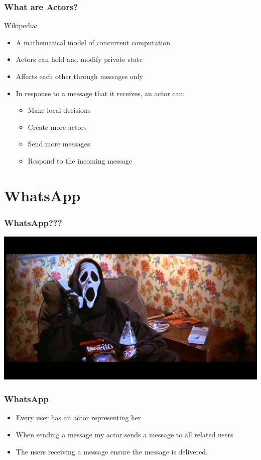 \documentclass{beamer}
\begin{document}
\begin{frame}
\frametitle{What are Actors?}
Wikipedia:
\begin{itemize}
\item A mathematical model of concurrent computation
\item Actors can hold and modify private state
\item Affects each other through messages only
\item In response to a message that it receives, an actor can:
\begin{itemize}
\item Make local decisions
\item Create more actors
\item Send more messages
\item Respond to the incoming message
\end{itemize}
\end{itemize}
\end{frame}


\section{WhatsApp}


\begin{frame}
\frametitle{WhatsApp???}
\includegraphics[width=0.8\linewidth]{./whatsup.jpg}
\end{frame}


\begin{frame}
\frametitle{WhatsApp}
\begin{itemize}
\item Every user has an actor representing her
\item When sending a message my actor sends a message to all related users
\item The users receiving a message ensure the message is delivered.
\end{itemize}
\end{frame}
\end{document}
